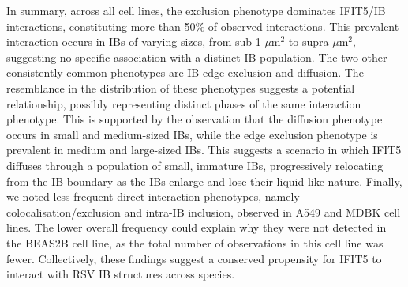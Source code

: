 In summary, across all cell lines, the exclusion phenotype dominates IFIT5/IB interactions, constituting more than 50\% of observed interactions. This prevalent interaction occurs in IBs of varying sizes, from sub 1 \(\mu \mbox{m}^2\) to supra \(\mu \mbox{m}^2\), suggesting no specific association with a distinct IB population. The two other consistently common phenotypes are IB edge exclusion and diffusion. The resemblance in the distribution of these phenotypes suggests a potential relationship, possibly representing distinct phases of the same interaction phenotype. This is supported by the observation that the diffusion phenotype occurs in small and medium-sized IBs, while the edge exclusion phenotype is prevalent in medium and large-sized IBs. This suggests a scenario in which IFIT5 diffuses through a population of small, immature IBs, progressively relocating from the IB boundary as the IBs enlarge and lose their liquid-like nature. Finally, we noted less frequent direct interaction phenotypes, namely colocalisation/exclusion and intra-IB inclusion, observed in A549 and MDBK cell lines. The lower overall frequency could explain why they were not detected in the BEAS2B cell line, as the total number of observations in this cell line was fewer. Collectively, these findings suggest a conserved propensity for IFIT5 to interact with RSV IB structures across species.

